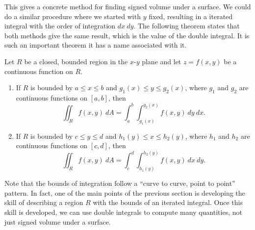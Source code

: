 This gives a concrete method for finding signed volume under a surface. We could do a similar procedure where we started with $y$ fixed, resulting in a iterated integral with the order of integration $dx\ dy$. The following theorem states that both methods give the same result, which is the value of the double integral. It is such an important theorem it has a name associated with it.

{Let $R$ be a closed, bounded region in the $x$-$y$ plane and let $z=f(x,y)$ be a continuous function on $R$.%
\begin{enumerate}
	\item If $R$ is bounded by $a\leq x\leq b$ and $g_1(x)\leq y\leq g_2(x)$, where $g_1$ and $g_2$ are continuous functions on $[a,b]$, then
	$$\iint_R f(x,y)\ dA = \int_a^b\int_{g_1(x)}^{g_2(x)} f(x,y)\ dy\ dx.$$
	
	\item If $R$ is bounded by $c\leq y\leq d$ and $h_1(y)\leq x\leq h_2(y)$, where $h_1$ and $h_2$ are continuous functions on $[c,d]$, then
	$$\iint_R f(x,y)\ dA = \int_c^d\int_{h_1(y)}^{h_2(y)} f(x,y)\ dx\ dy.$$
\end{enumerate}}

Note that the bounds of integration follow a ``curve to curve, point to point'' pattern. In fact, one of the main points of the previous section is developing the skill of describing a region $R$ with the bounds of an iterated integral. Once this skill is developed, we can use double integrals to compute many quantities, not just signed volume under a surface.


